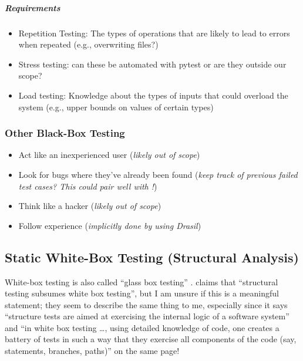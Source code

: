\subparagraph{Requirements}
\begin{itemize}
      \item Repetition Testing: The types of operations that are likely to lead
            to errors when repeated (e.g., overwriting files?)
      \item Stress testing: can these be automated with pytest or are they
            outside our scope? 
      \item Load testing: Knowledge about the types of inputs that could
            overload the system (e.g., upper bounds on values of certain types)
\end{itemize}

\subsubsection{Other Black-Box Testing \cite[pp.~87-89]{patton_software_2006}}
\begin{itemize}
      \item Act like an inexperienced user (\emph{likely out of scope})
      \item Look for bugs where they've already been found (\emph{keep track of
                  previous failed test cases? This could pair well with
                  !})
      \item Think like a hacker (\emph{likely out of scope})
      \item Follow experience (\emph{implicitly done by using Drasil})
\end{itemize}

\subsection{Static White-Box Testing (Structural Analysis)
      \cite[pp.~91-104]{patton_software_2006}}

White-box testing is also called ``glass box testing''
\cite[p.~439]{peters_software_2000}. \cite[p.~447]{peters_software_2000} claims
that ``structural testing subsumes white box testing'', but I am unsure if this
is a meaningful statement; they seem to describe the same thing to me, 
especially since it says ``structure tests are aimed at exercising the internal
logic of a software system'' and ``in white box testing \dots, using detailed
knowledge of code, one creates a battery of tests in such a way that they
exercise all components of the code (say, statements, branches, paths)'' on the
same page!

